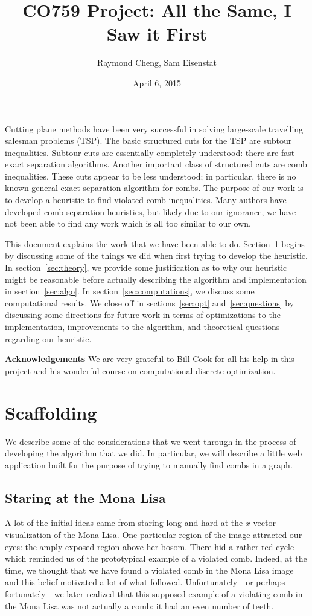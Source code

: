 \documentclass[12pt, letterpaper]{amsart}
\title{CO759 Project: All the Same, I Saw it First}
\author{Raymond Cheng, Sam Eisenstat}
\date{April 6, 2015}
\theoremstyle{plain}
\theoremstyle{definition}
\theoremstyle{remark}
\begin{document}
\maketitle
Cutting plane methods have been very successful in solving large-scale
travelling salesman problems (TSP). The basic structured cuts for the TSP are
subtour inequalities. Subtour cuts are essentially completely understood: there
are fast exact separation algorithms.  Another important class of structured
cuts are comb inequalities. These cuts appear to be less understood; in
particular, there is no known general exact separation algorithm for combs.
The purpose of our work is to develop a heuristic to find violated comb
inequalities.  Many authors have developed comb separation heuristics, but
likely due to our ignorance, we have not been able to find any work which is
all too similar to our own.

This document explains the work that we have been able to do.
Section~\ref{sec:scaffolding} begins by discussing some of the things we did
when first trying to develop the heuristic. In section~\ref{sec:theory}, we
provide some justification as to why our heuristic might be reasonable before
actually describing the algorithm and implementation in section~\ref{sec:algo}.
In section~\ref{sec:computations}, we discuss some computational results.  We
close off in sections~\ref{sec:opt} and~\ref{sec:questions} by discussing some
directions for future work in terms of optimizations to the implementation,
improvements to the algorithm, and theoretical questions regarding our
heuristic.

\noindent\textbf{Acknowledgements} We are very grateful to Bill Cook for all
his help in this project and his wonderful course on computational discrete
optimization.

\section{Scaffolding}\label{sec:scaffolding}
We describe some of the considerations that we went through in the process of
developing the algorithm that we did. In particular, we will describe a little
web application built for the purpose of trying to manually find combs in a graph.

\subsection{Staring at the Mona Lisa}
A lot of the initial ideas came from staring long and hard at the $x$-vector
visualization of the Mona Lisa. One particular region of the image attracted
our eyes: the amply exposed region above her bosom. There hid a rather red
cycle which reminded us of the prototypical example of a violated comb. Indeed,
at the time, we thought that we have found a violated comb in the Mona Lisa
image and this belief motivated a lot of what followed. Unfortunately---or perhaps
fortunately---we later realized that this supposed example of a violating comb
in the Mona Lisa was not actually a comb: it had an even number of teeth.
\end{document}
